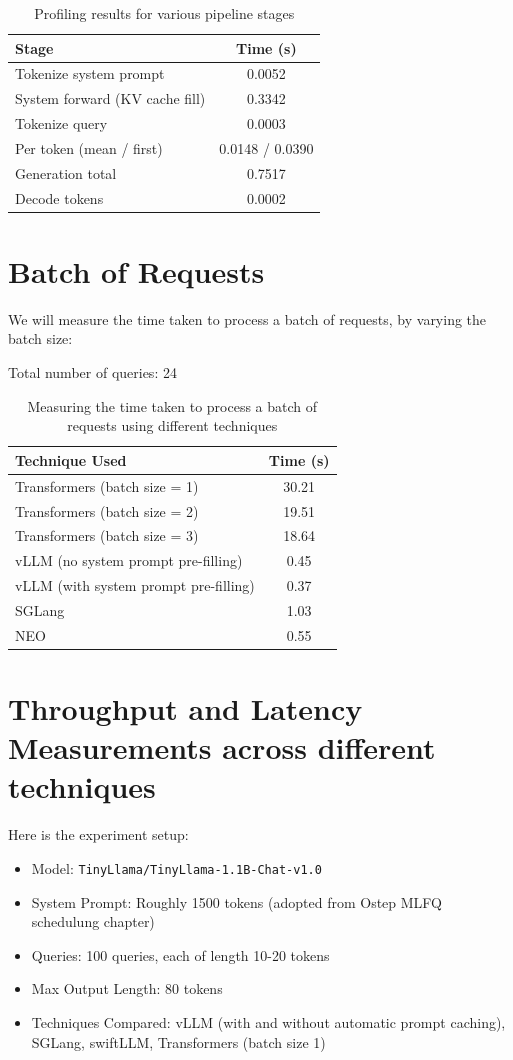 \begin{table}[h]
\centering
\begin{tabular}{|l|c|}
\hline
\textbf{Stage} & \textbf{Time (s)} \\
\hline
Tokenize system prompt & 0.0052 \\
System forward (KV cache fill) & 0.3342 \\
Tokenize query & 0.0003 \\
Per token (mean / first) & 0.0148 / 0.0390 \\
Generation total & 0.7517 \\
Decode tokens & 0.0002 \\
\hline
\end{tabular}
\caption{Profiling results for various pipeline stages}
\end{table}


\section{Batch of Requests} 
We will measure the time taken to process a batch of requests, by varying the batch size:

Total number of queries:  24

\begin{table}[h]
\centering
\begin{tabular}{|l|c|}
\hline
\textbf{Technique Used} & \textbf{Time (s)} \\
\hline
Transformers (batch size = 1) & 30.21 \\
Transformers (batch size = 2) & 19.51 \\
Transformers (batch size = 3) & 18.64 \\
vLLM (no system prompt pre-filling) & 0.45 \\
vLLM (with system prompt pre-filling) & 0.37 \\
SGLang & 1.03 \\
NEO & 0.55 \\
\hline
\end{tabular}
\caption{Measuring the time taken to process a batch of requests using different techniques}
\end{table}

\section{Throughput and Latency Measurements across different techniques}
Here is the experiment setup:
\begin{itemize}
    \item Model: \texttt{TinyLlama/TinyLlama-1.1B-Chat-v1.0}
    \item System Prompt: Roughly 1500 tokens (adopted from Ostep MLFQ schedulung chapter)
    \item Queries: 100 queries, each of length 10-20 tokens
    \item Max Output Length: 80 tokens
    \item Techniques Compared: vLLM (with and without automatic prompt caching), SGLang, swiftLLM, Transformers (batch size 1)
\end{itemize}

